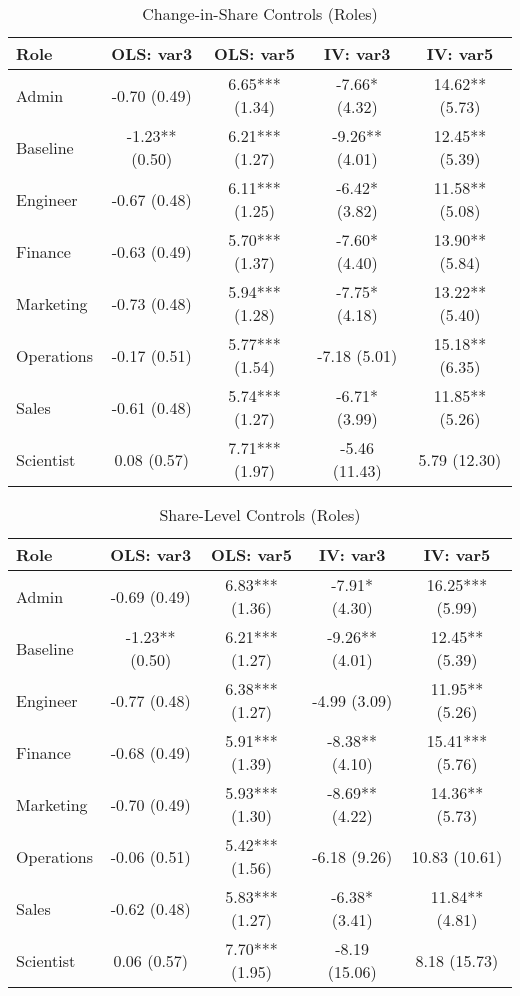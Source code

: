 \documentclass[11pt]{article}
\begin{document}
\begin{table}[H]
\centering
\caption{Change-in-Share Controls (Roles)}
\begin{tabular}{lcccc}
\toprule
Role & OLS: var3 & OLS: var5 & IV: var3 & IV: var5 \\
\midrule
Admin & -0.70 (0.49) & 6.65*** (1.34) & -7.66* (4.32) & 14.62** (5.73) \\
Baseline & -1.23** (0.50) & 6.21*** (1.27) & -9.26** (4.01) & 12.45** (5.39) \\
Engineer & -0.67 (0.48) & 6.11*** (1.25) & -6.42* (3.82) & 11.58** (5.08) \\
Finance & -0.63 (0.49) & 5.70*** (1.37) & -7.60* (4.40) & 13.90** (5.84) \\
Marketing & -0.73 (0.48) & 5.94*** (1.28) & -7.75* (4.18) & 13.22** (5.40) \\
Operations & -0.17 (0.51) & 5.77*** (1.54) & -7.18 (5.01) & 15.18** (6.35) \\
Sales & -0.61 (0.48) & 5.74*** (1.27) & -6.71* (3.99) & 11.85** (5.26) \\
Scientist & 0.08 (0.57) & 7.71*** (1.97) & -5.46 (11.43) & 5.79 (12.30) \\
\bottomrule
\end{tabular}
\end{table}

\begin{table}[H]
\centering
\caption{Share-Level Controls (Roles)}
\begin{tabular}{lcccc}
\toprule
Role & OLS: var3 & OLS: var5 & IV: var3 & IV: var5 \\
\midrule
Admin & -0.69 (0.49) & 6.83*** (1.36) & -7.91* (4.30) & 16.25*** (5.99) \\
Baseline & -1.23** (0.50) & 6.21*** (1.27) & -9.26** (4.01) & 12.45** (5.39) \\
Engineer & -0.77 (0.48) & 6.38*** (1.27) & -4.99 (3.09) & 11.95** (5.26) \\
Finance & -0.68 (0.49) & 5.91*** (1.39) & -8.38** (4.10) & 15.41*** (5.76) \\
Marketing & -0.70 (0.49) & 5.93*** (1.30) & -8.69** (4.22) & 14.36** (5.73) \\
Operations & -0.06 (0.51) & 5.42*** (1.56) & -6.18 (9.26) & 10.83 (10.61) \\
Sales & -0.62 (0.48) & 5.83*** (1.27) & -6.38* (3.41) & 11.84** (4.81) \\
Scientist & 0.06 (0.57) & 7.70*** (1.95) & -8.19 (15.06) & 8.18 (15.73) \\
\bottomrule
\end{tabular}
\end{table}
\end{document}
